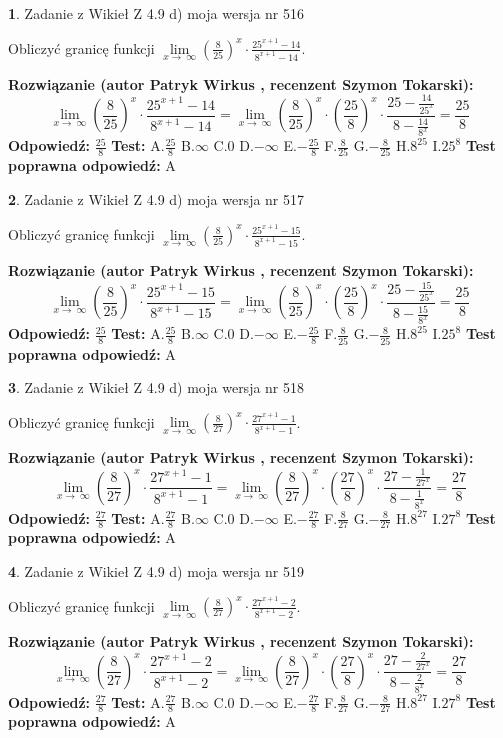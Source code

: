 \documentclass[12pt, a4paper]{article}
\theoremstyle{definition} %
\newtheorem{zad}{}
\newcommand{\zadStart}[1]{\begin{zad}#1\newline}
\newcommand{\zadStop}{\end{zad}}
\newcommand{\rozwStart}[2]{\noindent \textbf{Rozwiązanie (autor #1 , recenzent #2): }\newline}
\newcommand{\rozwStop}{\newline}
\newcommand{\odpStart}{\noindent \textbf{Odpowiedź:}\newline}
\newcommand{\odpStop}{\newline}
\newcommand{\testStart}{\noindent \textbf{Test:}\newline}
\newcommand{\testStop}{\newline}
\newcommand{\kluczStart}{\noindent \textbf{Test poprawna odpowiedź:}\newline}
\newcommand{\kluczStop}{\newline}
\begin{document}
\zadStart{Zadanie z Wikieł Z 4.9 d) moja wersja nr 516}


Obliczyć granicę funkcji  $\lim\limits_{x\to\ \infty}(\frac{8}{25})^{x}\cdot\frac{25^{x+1}-14}{8^{x+1}-14}$.
\zadStop
\rozwStart{Patryk Wirkus}{Szymon Tokarski}
$$\lim\limits_{x\to\ \infty}(\frac{8}{25})^{x}\cdot\frac{25^{x+1}-14}{8^{x+1}-14}=\lim\limits_{x\to\ \infty}(\frac{8}{25})^{x}\cdot(\frac{25}{8})^{x} \cdot \frac{25-\frac{14}{25^{x}}}{8-\frac{14}{8^{x}}} = \frac{25}{8}$$
\rozwStop
\odpStart
$\frac{25}{8}$
\odpStop
\testStart
A.$\frac{25}{8}$ B.$\infty$ C.$0$ D.$-\infty$ E.$-\frac{25}{8}$
F.$\frac{8}{25}$ G.$-\frac{8}{25}$
H.$8^{25}$
I.$25^{8}$
\testStop
\kluczStart
A
\kluczStop



\zadStart{Zadanie z Wikieł Z 4.9 d) moja wersja nr 517}


Obliczyć granicę funkcji  $\lim\limits_{x\to\ \infty}(\frac{8}{25})^{x}\cdot\frac{25^{x+1}-15}{8^{x+1}-15}$.
\zadStop
\rozwStart{Patryk Wirkus}{Szymon Tokarski}
$$\lim\limits_{x\to\ \infty}(\frac{8}{25})^{x}\cdot\frac{25^{x+1}-15}{8^{x+1}-15}=\lim\limits_{x\to\ \infty}(\frac{8}{25})^{x}\cdot(\frac{25}{8})^{x} \cdot \frac{25-\frac{15}{25^{x}}}{8-\frac{15}{8^{x}}} = \frac{25}{8}$$
\rozwStop
\odpStart
$\frac{25}{8}$
\odpStop
\testStart
A.$\frac{25}{8}$ B.$\infty$ C.$0$ D.$-\infty$ E.$-\frac{25}{8}$
F.$\frac{8}{25}$ G.$-\frac{8}{25}$
H.$8^{25}$
I.$25^{8}$
\testStop
\kluczStart
A
\kluczStop



\zadStart{Zadanie z Wikieł Z 4.9 d) moja wersja nr 518}


Obliczyć granicę funkcji  $\lim\limits_{x\to\ \infty}(\frac{8}{27})^{x}\cdot\frac{27^{x+1}-1}{8^{x+1}-1}$.
\zadStop
\rozwStart{Patryk Wirkus}{Szymon Tokarski}
$$\lim\limits_{x\to\ \infty}(\frac{8}{27})^{x}\cdot\frac{27^{x+1}-1}{8^{x+1}-1}=\lim\limits_{x\to\ \infty}(\frac{8}{27})^{x}\cdot(\frac{27}{8})^{x} \cdot \frac{27-\frac{1}{27^{x}}}{8-\frac{1}{8^{x}}} = \frac{27}{8}$$
\rozwStop
\odpStart
$\frac{27}{8}$
\odpStop
\testStart
A.$\frac{27}{8}$ B.$\infty$ C.$0$ D.$-\infty$ E.$-\frac{27}{8}$
F.$\frac{8}{27}$ G.$-\frac{8}{27}$
H.$8^{27}$
I.$27^{8}$
\testStop
\kluczStart
A
\kluczStop



\zadStart{Zadanie z Wikieł Z 4.9 d) moja wersja nr 519}


Obliczyć granicę funkcji  $\lim\limits_{x\to\ \infty}(\frac{8}{27})^{x}\cdot\frac{27^{x+1}-2}{8^{x+1}-2}$.
\zadStop
\rozwStart{Patryk Wirkus}{Szymon Tokarski}
$$\lim\limits_{x\to\ \infty}(\frac{8}{27})^{x}\cdot\frac{27^{x+1}-2}{8^{x+1}-2}=\lim\limits_{x\to\ \infty}(\frac{8}{27})^{x}\cdot(\frac{27}{8})^{x} \cdot \frac{27-\frac{2}{27^{x}}}{8-\frac{2}{8^{x}}} = \frac{27}{8}$$
\rozwStop
\odpStart
$\frac{27}{8}$
\odpStop
\testStart
A.$\frac{27}{8}$ B.$\infty$ C.$0$ D.$-\infty$ E.$-\frac{27}{8}$
F.$\frac{8}{27}$ G.$-\frac{8}{27}$
H.$8^{27}$
I.$27^{8}$
\testStop
\kluczStart
A
\kluczStop
\end{document}
